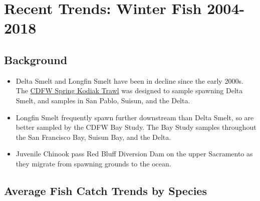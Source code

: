\documentclass[
]{book}
\providecommand{\tightlist}{%
  \setlength{\itemsep}{0pt}\setlength{\parskip}{0pt}}
\begin{document}
\hypertarget{recent-trends-winter-fish-2004-2018}{%
\section{Recent Trends: Winter Fish 2004-2018}\label{recent-trends-winter-fish-2004-2018}}

\hypertarget{background-5}{%
\subsection{Background}\label{background-5}}

\begin{itemize}
\tightlist
\item
  Delta Smelt and Longfin Smelt have been in decline since the early 2000s. The \href{https://www.wildlife.ca.gov/Conservation/Delta/Spring-Kodiak-Trawl}{CDFW Spring Kodiak Trawl} was designed to sample spawning Delta Smelt, and samples in San Pablo, Suisun, and the Delta.
\item
  Longfin Smelt frequently spawn further downstream than Delta Smelt, so are better sampled by the CDFW Bay Study. The Bay Study samples throughout the San Francisco Bay, Suisun Bay, and the Delta.
\item
  Juvenile Chinook pass Red Bluff Diversion Dam on the upper Sacramento as they migrate from spawning grounds to the ocean.
\end{itemize}

\hypertarget{average-fish-catch-trends-by-species-1}{%
\subsection{Average Fish Catch Trends by Species}\label{average-fish-catch-trends-by-species-1}}
\end{document}
